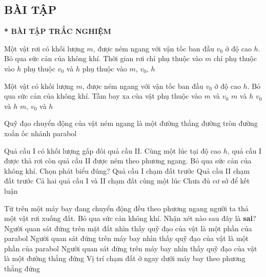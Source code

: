 \subsection{BÀI TẬP}
\textbf{* BÀI TẬP TRẮC NGHIỆM}
\setcounter{ex}{0}
\begin{ex}
	Một vật rơi có khối lượng $m$, được ném ngang với vận tốc ban đầu $v_0$ ở độ cao $h$. Bỏ qua sức cản của không khí. Thời gian rơi	
	\choice
	{chỉ phụ thuộc vào $m$}
	{\True chỉ phụ thuộc vào $h$}
	{phụ thuộc $v_0$ và $h$}
	{phụ thuộc vào $m$, $v_0$, $h$}
	\loigiai{}
\end{ex}
\begin{ex}
	Một vật có khối lượng $m$, được ném ngang với vận tốc ban đầu $v_0$ ở độ cao $h$. Bỏ qua sức cản của không khí. Tầm bay xa của vật phụ thuộc vào
	\choice
	{$m$ và $v_0$}
	{$m$ và $h$}
	{$v_0$ và $h$}
	{$m$, $v_0$ và $h$}
	\loigiai{}
\end{ex}
\begin{ex}
	Quỹ đạo chuyển động của vật ném ngang là một 
	\choice
	{đường thẳng}
	{đường tròn}
	{đường xoắn ốc}
	{nhánh parabol}
	\loigiai{}
\end{ex}
\begin{ex}
	Quả cầu I có khối lượng  gấp đôi quả cầu II. Cùng một lúc tại độ cao $h$, quả cầu I được thả rơi còn quả cầu II được ném theo phương ngang. Bỏ qua sức cản của không khí. Chọn phát biểu đúng?
	\choice
	{Quả cầu I chạm đất trước}
	{Quả cầu II chạm đất trước}
	{Cả hai quả cầu I và II chạm đất cùng một lúc}
	{Chưa đủ cơ sở để kết luận}
	\loigiai{}
\end{ex}
\begin{ex}
	Từ trên một máy bay đang chuyển động đều theo phương ngang người ta thả một vật rơi xuống đất. Bỏ qua sức cản không khí. Nhận xét nào sau đây là \textbf{sai}?	
	\choice
	{Người quan sát đứng trên mặt đất nhìn thấy quỹ đạo của vật là một phần của parabol}
	{Người quan sát đứng trên máy bay nhìn thấy quỹ đạo của vật là một phần của parabol}
	{Người quan sát đứng trên máy bay nhìn thấy quỹ đạo của vật là một đường thẳng đứng}
	{Vị trí chạm đất ở ngay dưới máy bay theo phương thẳng đứng}
	\loigiai{}
\end{ex}

